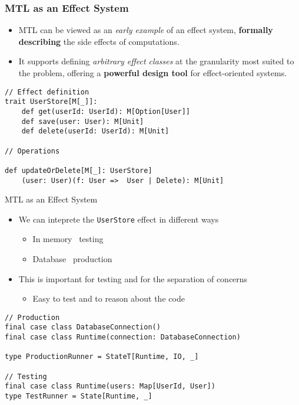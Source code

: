 \documentclass[presentation, 10pt]{beamer}\mode<presentation>{\usetheme{metropolis}}
\begin{document}
\begin{frame}[fragile]
	\frametitle{MTL as an \textbf{Effect System}}
		
		\begin{itemize}
			\item MTL can be viewed as an \emph{early example} of an effect system, \textbf{formally describing} the side effects of computations.
			\item It supports defining \emph{arbitrary effect classes} at the granularity most suited to the problem, offering a \textbf{powerful design tool} for effect-oriented systems.
		\end{itemize}
\begin{tcolorbox}
\begin{verbatim}
// Effect definition
trait UserStore[M[_]]:
	def get(userId: UserId): M[Option[User]]
	def save(user: User): M[Unit]
	def delete(userId: UserId): M[Unit]

// Operations

def updateOrDelete[M[_]: UserStore]
 	(user: User)(f: User =>  User | Delete): M[Unit]

\end{verbatim}
\end{tcolorbox}
\end{frame}
\begin{frame}[fragile]{MTL as an Effect System}
	\begin{itemize}
		\item We can inteprete the \texttt{UserStore} effect in different ways
		\begin{itemize}
			\item In memory \faArrowRight \, testing
			\item Database \faArrowRight \, production
		\end{itemize}
		\item This is important for testing and for the separation of concerns
		\begin{itemize}
			\item Easy to test and to reason about the code
		\end{itemize}
	\end{itemize}
\begin{tcolorbox}
\begin{verbatim}
// Production
final case class DatabaseConnection()
final case class Runtime(connection: DatabaseConnection)

type ProductionRunner = StateT[Runtime, IO, _]

// Testing
final case class Runtime(users: Map[UserId, User])
type TestRunner = State[Runtime, _]
\end{verbatim}
\end{tcolorbox}
\end{frame}
\end{document}
